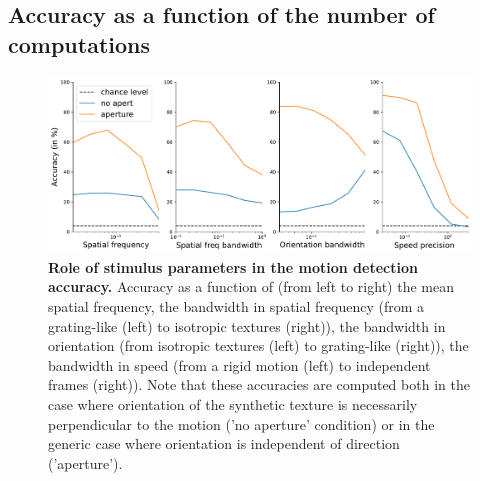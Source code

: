 \documentclass[landscape,a0]{a0poster}
\newcommand{\colorsubsec}{gray}
\begin{document}
\begin{multicols}{3}
\subsection*{\color{\colorsubsec}Accuracy as a function of the number of computations}
\begin{figure}[H]
    \centering
    \includegraphics[width=0.99\linewidth]{figures/motion_clouds.pdf} %
    \caption{{\bf Role of stimulus parameters in the motion detection accuracy.} Accuracy as a function of (from left to right) the mean spatial frequency, the bandwidth in spatial frequency (from a grating-like (left) to isotropic textures (right)), the bandwidth in orientation (from isotropic textures (left) to grating-like (right)), the bandwidth in speed (from a rigid motion (left) to independent frames (right)). Note that these accuracies are computed both in the case where orientation of the synthetic texture is necessarily perpendicular to the motion ('no aperture' condition) or in the generic case where orientation is independent of direction ('aperture').}
    \label{fig:motion_clouds}
\end{figure}

\end{multicols}
\end{document}

